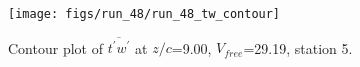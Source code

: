 \begin{figure}[H]
\centering
\texttt{[image: figs/run\_48/run\_48\_tw\_contour]}
\caption{Contour plot of $\overline{t^\prime w^\prime}$ at $z/c$=9.00, $V_{free}$=29.19, station 5.}
\label{fig:run_48_tw_contour}
\end{figure}


